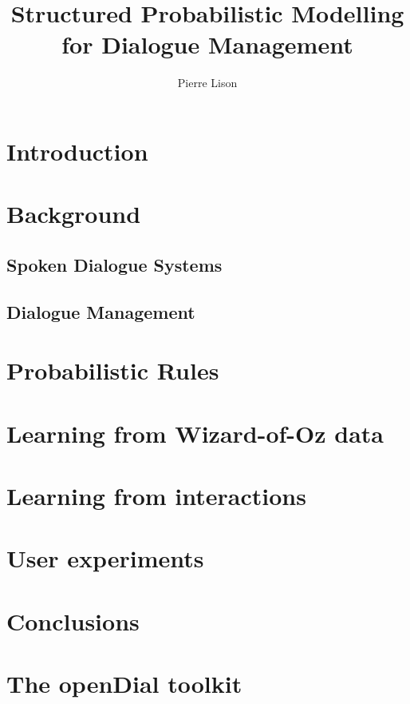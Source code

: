 \documentclass[english]{uiophd}
\title{Structured Probabilistic Modelling \\ for Dialogue Management}
\author{Pierre Lison}
\begin{document}
\frontmatter
\maketitle
\tableofcontents

\mainmatter

\chapter{Introduction}

\chapter{Background}

\section{Spoken Dialogue Systems}

\section{Dialogue Management}

\chapter{Probabilistic Rules}

\chapter{Learning from Wizard-of-Oz data}

\chapter{Learning from interactions}

\chapter{User experiments}

\chapter{Conclusions}

\appendix

\chapter{The openDial toolkit}
\end{document}
